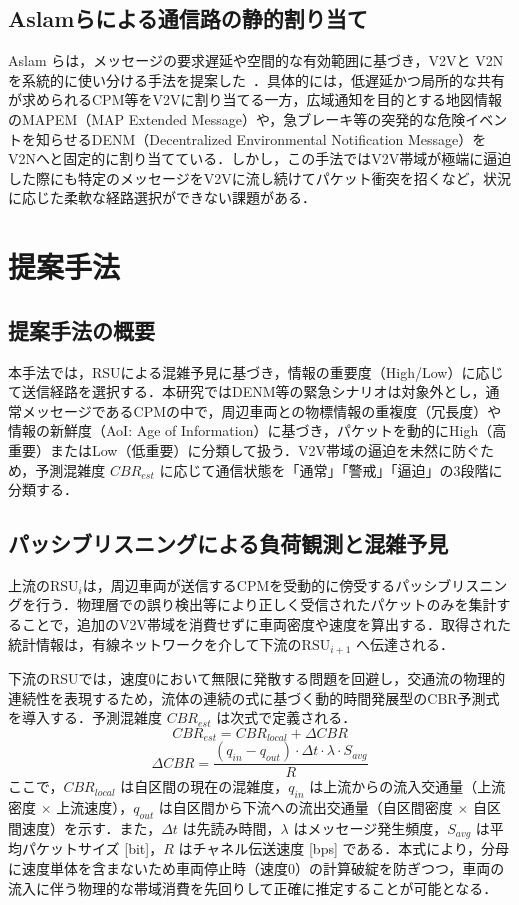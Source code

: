 \documentclass[a4paper,10pt,twocolumn,uplatex]{jsarticle}
\begin{document}
\subsection{Aslamらによる通信路の静的割り当て}
Aslam らは，メッセージの要求遅延や空間的な有効範囲に基づき，V2Vと V2Nを系統的に使い分ける手法を提案した~\cite{Aslam2025}．具体的には，低遅延かつ局所的な共有が求められるCPM等をV2Vに割り当てる一方，広域通知を目的とする地図情報のMAPEM（MAP Extended Message）や，急ブレーキ等の突発的な危険イベントを知らせるDENM（Decentralized Environmental Notification Message）をV2Nへと固定的に割り当てている．しかし，この手法ではV2V帯域が極端に逼迫した際にも特定のメッセージをV2Vに流し続けてパケット衝突を招くなど，状況に応じた柔軟な経路選択ができない課題がある．

\section{提案手法}
\subsection{提案手法の概要}
本手法では，RSUによる混雑予見に基づき，情報の重要度（High/Low）に応じて送信経路を選択する．本研究ではDENM等の緊急シナリオは対象外とし，通常メッセージであるCPMの中で，周辺車両との物標情報の重複度（冗長度）や情報の新鮮度（AoI: Age of Information）に基づき，パケットを動的にHigh（高重要）またはLow（低重要）に分類して扱う．V2V帯域の逼迫を未然に防ぐため，予測混雑度 $CBR_{est}$ に応じて通信状態を「通常」「警戒」「逼迫」の3段階に分類する．

\subsection{パッシブリスニングによる負荷観測と混雑予見}
上流の$\mathrm{RSU}_i$は，周辺車両が送信するCPMを受動的に傍受するパッシブリスニングを行う．物理層での誤り検出等により正しく受信されたパケットのみを集計することで，追加のV2V帯域を消費せずに車両密度や速度を算出する．取得された統計情報は，有線ネットワークを介して下流の$\mathrm{RSU}_{i+1}$ へ伝達される．

下流のRSUでは，速度0において無限に発散する問題を回避し，交通流の物理的連続性を表現するため，流体の連続の式に基づく動的時間発展型のCBR予測式を導入する．予測混雑度 $CBR_{est}$ は次式で定義される．
\begin{equation}
CBR_{est} = CBR_{local} + \Delta CBR
\end{equation}
\begin{equation}
\Delta CBR = \frac{(q_{in} - q_{out}) \cdot \Delta t \cdot \lambda \cdot S_{avg}}{R}
\end{equation}
ここで，$CBR_{local}$ は自区間の現在の混雑度，$q_{in}$ は上流からの流入交通量（上流密度 $\times$ 上流速度），$q_{out}$ は自区間から下流への流出交通量（自区間密度 $\times$ 自区間速度）を示す．また，$\Delta t$ は先読み時間，$\lambda$ はメッセージ発生頻度，$S_{avg}$ は平均パケットサイズ [bit]，$R$ はチャネル伝送速度 [bps] である．本式により，分母に速度単体を含まないため車両停止時（速度0）の計算破綻を防ぎつつ，車両の流入に伴う物理的な帯域消費を先回りして正確に推定することが可能となる．
\end{document}
